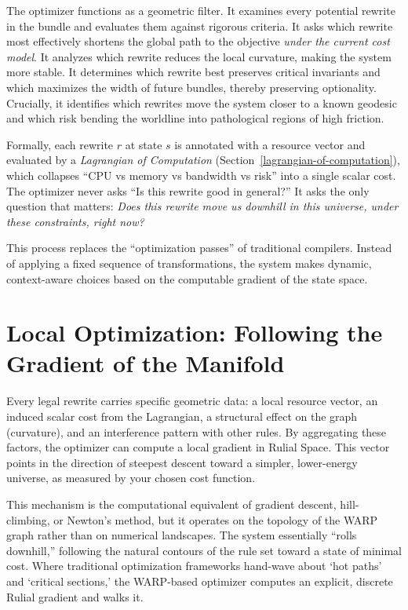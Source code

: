 The optimizer functions as a geometric filter. It examines every potential rewrite in the bundle and evaluates them against rigorous criteria. It asks which rewrite most effectively shortens the global path to the objective \emph{under the current cost model}. It analyzes which rewrite reduces the local curvature, making the system more stable. It determines which rewrite best preserves critical invariants and which maximizes the width of future bundles, thereby preserving optionality. Crucially, it identifies which rewrites move the system closer to a known geodesic and which risk bending the worldline into pathological regions of high friction.

Formally, each rewrite $r$ at state $s$ is annotated with a resource vector and evaluated by a \emph{Lagrangian of Computation} (Section~\ref{lagrangian-of-computation}), which collapses ``CPU vs memory vs bandwidth vs risk'' into a single scalar cost. The optimizer never asks ``Is this rewrite good in general?'' It asks the only question that matters: \emph{Does this rewrite move us downhill in this universe, under these constraints, right now?}

This process replaces the ``optimization passes'' of traditional compilers. Instead of applying a fixed sequence of transformations, the system makes dynamic, context-aware choices based on the computable gradient of the state space.

\section{Local Optimization: Following the Gradient of the Manifold}
\label{local-optimization-following-the-gradient-of-the-manifold}

Every legal rewrite carries specific geometric data: a local resource vector, an induced scalar cost from the Lagrangian, a structural effect on the graph (curvature), and an interference pattern with other rules. By aggregating these factors, the optimizer can compute a local gradient in Rulial Space. This vector points in the direction of steepest descent toward a simpler, lower-energy universe, as measured by your chosen cost function.

This mechanism is the computational equivalent of gradient descent, hill-climbing, or Newton's method, but it operates on the topology of the WARP graph rather than on numerical landscapes. The system essentially ``rolls downhill,'' following the natural contours of the rule set toward a state of minimal cost. Where traditional optimization frameworks hand-wave about `hot paths' and `critical sections,' the WARP-based optimizer computes an explicit, discrete Rulial gradient and walks it.

